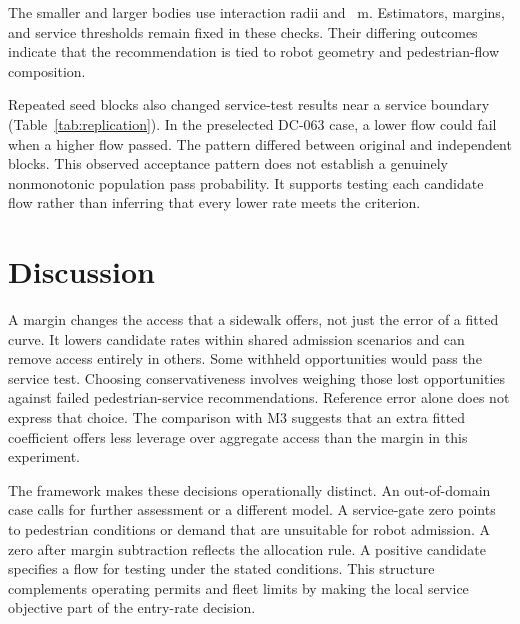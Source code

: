 \documentclass[NewProceedings,letterpaper]{ascelike-new}
\begin{document}
\begin{table}[!htbp]
\centering\caption{Sensitivity at \SensitivityFlow{}~robots/min for scenarios of width \NarrowWidth{} and \WideWidth{}~m. Each setting has a matching baseline.}
\label{tab:sensitivity}
\end{table}

The smaller and larger bodies use interaction radii \SmallRadius{} and \LargeRadius{}~m. Estimators, margins, and service thresholds remain fixed in these checks. Their differing outcomes indicate that the recommendation is tied to robot geometry and pedestrian-flow composition.

Repeated seed blocks also changed service-test results near a service boundary (Table~\ref{tab:replication}). In the preselected DC-063 case, a lower flow could fail when a higher flow passed. The pattern differed between original and independent blocks. This observed acceptance pattern does not establish a genuinely nonmonotonic population pass probability. It supports testing each candidate flow rather than inferring that every lower rate meets the criterion.

\begin{table}[!htbp]
\centering\caption{Boundary case DC-063: passing seeds in original and independent blocks, each with its own baseline mean. Qualification requires \PassN{}/\SeedN{}.}
\label{tab:replication}
\end{table}

\section{Discussion}
A margin changes the access that a sidewalk offers, not just the error of a fitted curve. It lowers candidate rates within shared admission scenarios and can remove access entirely in others. Some withheld opportunities would pass the service test. Choosing conservativeness involves weighing those lost opportunities against failed pedestrian-service recommendations. Reference error alone does not express that choice. The comparison with M3 suggests that an extra fitted coefficient offers less leverage over aggregate access than the margin in this experiment.

The framework makes these decisions operationally distinct. An out-of-domain case calls for further assessment or a different model. A service-gate zero points to pedestrian conditions or demand that are unsuitable for robot admission. A zero after margin subtraction reflects the allocation rule. A positive candidate specifies a flow for testing under the stated conditions. This structure complements operating permits and fleet limits by making the local service objective part of the entry-rate decision.
\end{document}
